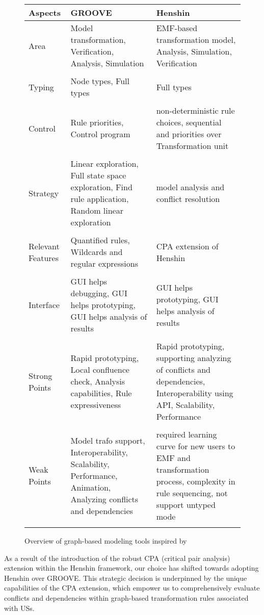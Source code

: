 \begin{figure}
\begingroup
\footnotesize
\centering
\begin{tabularx}{\textwidth}{l  X  X}
\hline
Aspects&	GROOVE	&Henshin\\
\hline\hline
Area	&Model transformation, Veriﬁcation, Analysis, Simulation	&EMF-based transformation model, Analysis, Simulation, Verification \\ \\ 
Typing&	Node types, Full types	&Full types\\\\ 
Control&	Rule priorities, Control program	&non-deterministic rule choices, sequential and priorities over Transformation unit \\\\ 
Strategy&	Linear exploration, Full state space exploration, Find rule application, Random linear exploration	&model analysis and conflict resolution\\\\ 
Relevant Features&	Quantiﬁed rules, Wildcards and regular expressions	&CPA extension of Henshin\\\\ 
Interface&	GUI helps debugging, GUI helps prototyping, GUI helps analysis of results	&GUI helps prototyping, GUI helps analysis of results\\\\ 
Strong Points&	Rapid prototyping, Local conﬂuence check, Analysis capabilities, Rule expressiveness	&Rapid prototyping, supporting analyzing of conflicts and dependencies, Interoperability using API, Scalability, Performance\\\\ 
Weak Points&	Model trafo support, Interoperability, Scalability, Performance, Animation, Analyzing conflicts and dependencies 	&required learning curve for new users to EMF and transformation process, complexity in rule sequencing, not support untyped mode\\\\ 
\hline

\end{tabularx}
\begin{TableCaption}
\caption{Overview of graph-based modeling tools inspired by \cite{ghamarian2012modelling}}\label{tb:sec_6_comparative_analysis_final}
\end{TableCaption}
\endgroup
\end{figure}
As a result of the introduction of the robust CPA (critical pair analysis) extension within the Henshin framework, our choice has shifted towards adopting Henshin over GROOVE. This strategic decision is underpinned by the unique capabilities of the CPA extension, which empower us to comprehensively evaluate conflicts and dependencies within graph-based transformation rules associated with USs. 

